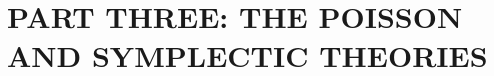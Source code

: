 \documentclass{report}
\begin{document}








\chapter{PART THREE: THE POISSON AND SYMPLECTIC THEORIES}








\end{document}
